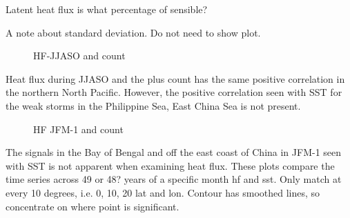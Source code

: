 Latent heat flux is what percentage of sensible?

A note about standard deviation. Do not need to show plot.



\begin{figure}
	\centering

	\caption{HF-JJASO and count } \label{fig:corr_JJASO_hf} 
\end{figure} 

Heat flux during JJASO and the plus count has the same positive correlation in the northern North Pacific. However, the positive correlation seen with SST for the weak storms in the Philippine Sea, East China Sea is not present.

\begin{figure}
	\centering
	
	\caption{HF JFM-1 and count } \label{fig:corr_JFN-1_hf} 
\end{figure} 

The signals in the Bay of Bengal and off the east coast of China in JFM-1 seen with SST is not apparent when examining heat flux.
%	
These plots compare the time series across 49 or 48? years of a specific month hf and sst.
Only match at every 10 degrees, i.e. 0, 10, 20 lat and lon. Contour has smoothed lines, so concentrate on where point is significant.

